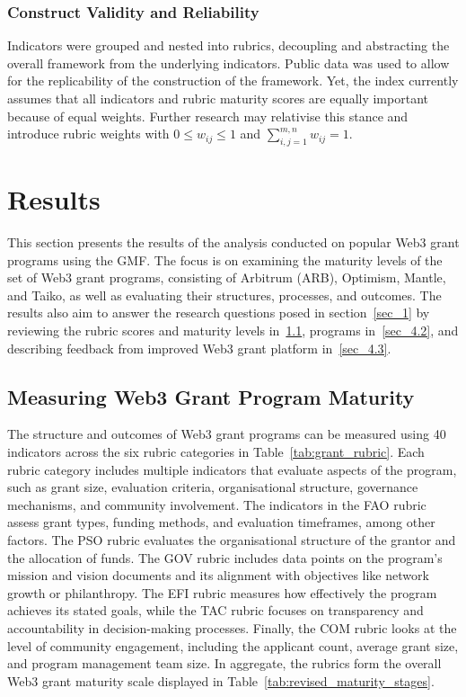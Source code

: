 \documentclass[conference]{IEEEtran}
\begin{document}
\subsubsection{Construct Validity and Reliability}\label{sec_3.2.3}

Indicators were grouped and nested into rubrics, decoupling and abstracting the overall framework from the underlying indicators. Public data was used to allow for the replicability of the construction of the framework. Yet, the index currently assumes that all indicators and rubric maturity scores are equally important because of equal weights. Further research may relativise this stance and introduce rubric weights with \( 0 \leq w_{ij} \leq 1 \) and \( \sum_{i,j=1}^{m,n} w_{ij} = 1\).

\section{Results}\label{sec_4}

This section presents the results of the analysis conducted on popular Web3 grant programs using the GMF. The focus is on examining the maturity levels of the set of Web3 grant programs, consisting of Arbitrum (ARB), Optimism, Mantle, and Taiko, as well as evaluating their structures, processes, and outcomes. The results also aim to answer the research questions posed in section~\ref{sec_1} by reviewing the rubric scores and maturity levels in~\ref{sec_4.1}, programs in~\ref{sec_4.2}, and describing feedback from improved Web3 grant platform in~\ref{sec_4.3}.

\subsection{Measuring Web3 Grant Program Maturity}\label{sec_4.1}

The structure and outcomes of Web3 grant programs can be measured using 40 indicators across the six rubric categories in Table~\ref{tab:grant_rubric}. Each rubric category includes multiple indicators that evaluate aspects of the program, such as grant size, evaluation criteria, organisational structure, governance mechanisms, and community involvement. The indicators in the FAO rubric assess grant types, funding methods, and evaluation timeframes, among other factors. The PSO rubric evaluates the organisational structure of the grantor and the allocation of funds. The GOV rubric includes data points on the program's mission and vision documents and its alignment with objectives like network growth or philanthropy. The EFI rubric measures how effectively the program achieves its stated goals, while the TAC rubric focuses on transparency and accountability in decision-making processes. Finally, the COM rubric looks at the level of community engagement, including the applicant count, average grant size, and program management team size. In aggregate, the rubrics form the overall Web3 grant maturity scale displayed in Table~\ref{tab:revised_maturity_stages}.
\end{document}
